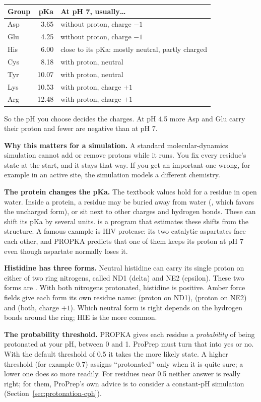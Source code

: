 \begin{tabularx}{\linewidth}{@{}lrL@{}}
\toprule
\textbf{Group} & \textbf{pKa} & \textbf{At pH 7, usually\ldots} \\
\midrule
Asp & 3.65 & without proton, charge $-1$ \\
Glu & 4.25 & without proton, charge $-1$ \\
His & 6.00 & close to its pKa: mostly neutral, partly charged \\
Cys & 8.18 & with proton, neutral \\
Tyr & 10.07 & with proton, neutral \\
Lys & 10.53 & with proton, charge $+1$ \\
Arg & 12.48 & with proton, charge $+1$ \\
\bottomrule
\end{tabularx}

\medskip
\noindent So the pH you choose decides the charges. At pH 4.5 more Asp and Glu
carry their proton and fewer are negative than at pH 7.

\textbf{Why this matters for a simulation.} A standard molecular-dynamics
simulation cannot add or remove protons while it runs. You fix every residue's
state at the start, and it stays that way. If you get an important one wrong,
for example in an active site, the simulation models a different chemistry.

\textbf{The protein changes the pKa.} The textbook values hold for a residue
in open water. Inside a protein, a residue may be buried away from water
(, which favors the uncharged form), or sit next to other
charges and hydrogen bonds. These can shift its pKa by several units.
 is a program that estimates these shifts from the structure. A
famous example is HIV protease: its two catalytic aspartates face each other,
and PROPKA predicts that one of them keeps its proton at pH 7 even though
aspartate normally loses it.

\textbf{Histidine has three forms.} Neutral histidine can carry its single
proton on either of two ring nitrogens, called ND1 (delta) and NE2 (epsilon).
These two forms are . With both nitrogens protonated, histidine
is positive. Amber force fields give each form its own residue name:
 (proton on ND1),  (proton on NE2) and  (both,
charge $+1$). Which neutral form is right depends on the hydrogen bonds around
the ring; HIE is the more common.

\textbf{The probability threshold.} PROPKA gives each residue a
\emph{probability} of being protonated at your pH, between 0 and 1. ProPrep
must turn that into yes or no. With the default threshold of 0.5 it takes the
more likely state. A higher threshold (for example 0.7) assigns ``protonated''
only when it is quite sure; a lower one does so more readily. For residues near
0.5 neither answer is really right; for them, ProPrep's own advice is to
consider a constant-pH simulation (Section~\ref{sec:protonation-cph}).

